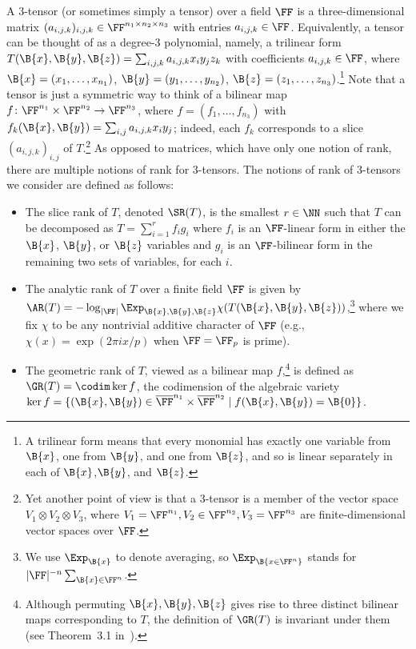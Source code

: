 A $3$-tensor (or sometimes simply a tensor) over a field $\FF$ is a three-dimensional matrix $(a_{i,j,k})_{i,j,k}\in\FF^{n_1 \times n_2 \times n_3}$ with entries $a_{i,j,k} \in \FF$. 
Equivalently, a tensor can be thought of as a degree-$3$ polynomial, namely, a trilinear form $T(\B{x},\B{y},\B{z}) = \sum_{i,j,k} a_{i,j,k} x_iy_jz_k$ with coefficients $a_{i,j,k} \in \FF$, where $\B{x}=(x_1,\ldots,x_{n_1})$, $\B{y}=(y_1,\ldots,y_{n_2})$, $\B{z}=(z_1,\ldots,z_{n_3})$.\footnote{A trilinear form means that every monomial has exactly one variable from $\B{x}$, one from $\B{y}$, and one from $\B{z}$, and so is linear separately in each of $\B{x}$,$\B{y}$, and $\B{z}$.}
Note that a tensor is just a symmetric way to think of a bilinear map 
$f \colon \FF^{n_1} \times \FF^{n_2} \to \FF^{n_3}$, where $f=(f_1,\ldots,f_{n_3})$ with $f_k(\B{x},\B{y}) = \sum_{i,j} a_{i,j,k}x_iy_j$; indeed, each $f_k$ corresponds to a slice $(a_{i,j,k})_{i,j}$ of $T$.\footnote{Yet another point of view is that a $3$-tensor is a member of the vector space $V_1 \otimes V_2 \otimes V_3$, where $V_1=\FF^{n_1},V_2\in\FF^{n_2},V_3=\FF^{n_3}$ are finite-dimensional vector spaces over $\FF$.}
As opposed to matrices, which have only one notion of rank, there are multiple notions of rank for $3$-tensors. 
The notions of rank of $3$-tensors we consider are defined as follows:
\begin{itemize}
	\item The slice rank of $T$, denoted $\SR(T)$, is the smallest $r \in \NN$ such that $T$ can be decomposed as $T = \sum_{i=1}^r f_i g_i$ where $f_i$ is an $\FF$-linear form in either the $\B{x}$, $\B{y}$, or $\B{z}$ variables and $g_i$ is an $\FF$-bilinear form in the remaining two sets of variables, for each $i$.
	\item The analytic rank of $T$ over a finite field $\FF$ is given by $\AR(T) = -\log_{|\FF|}\Exp_{\B{x},\B{y},\B{z}} \chi(T(\B{x},\B{y},\B{z}))$,\footnote{We use $\Exp_\B{x}$ to denote averaging, so $\Exp_\B{x \in \FF^{n}}$ stands for $|\FF|^{-n}\sum_{\B{x} \in \FF^{n}}$.} where we fix $\chi$ to be any nontrivial additive character of $\FF$ (e.g., $\chi(x)=\exp(2\pi i x/p)$ when $\FF=\FF_p$ is prime). 
	\item The geometric rank of $T$, viewed as a bilinear map $f$,\footnote{Although permuting $\B{x},\B{y},\B{z}$ gives rise to three distinct bilinear maps corresponding to $T$, the definition of $\GR(T)$ is invariant under them (see Theorem~3.1 in~\cite{KoppartyMoZu20}).} is defined as $\GR(T) = \codim \ker f$, the codimension of the algebraic variety $\ker f = \{(\B{x},\B{y}) \in \overline{\FF}^{n_1} \times \overline{\FF}^{n_2} \mid f(\B{x},\B{y})=\B{0}\}$. 
\end{itemize}


